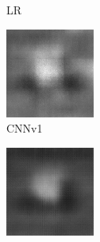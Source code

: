 \begin{figure}[H]
\begin{subfigure}[t]{0.15\textwidth}
    \caption{LR}
  \end{subfigure}
  \begin{subfigure}[t]{0.15\textwidth}
    \includegraphics[width=\linewidth]{img/one-trial/prediction_4_cnnv1.png}
    \caption{CNNv1}
  \end{subfigure}
  \begin{subfigure}[t]{0.15\textwidth}
    \includegraphics[width=\linewidth]{img/one-trial/prediction_4_cnnv2.png}

\end{subfigure}
\end{figure}
